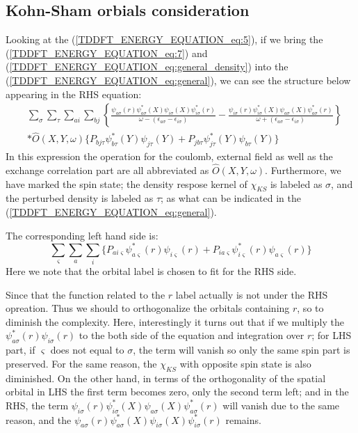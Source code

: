\subsection{Kohn-Sham orbials consideration}
%
%
%
%
Looking at the (\ref{TDDFT_ENERGY_EQUATION_eq:5}),  if we bring the 
(\ref{TDDFT_ENERGY_EQUATION_eq:7}) and
(\ref{TDDFT_ENERGY_EQUATION_eq:general_density})
into the
(\ref{TDDFT_ENERGY_EQUATION_eq:general}), we can see the structure
below appearing in the RHS equation: 
\begin{equation}
\begin{split}
 &\sum_{\sigma}\sum_{\tau}\sum_{ai}\sum_{bj}\left\lbrace
\frac{\psi_{a\sigma}(r)\psi_{a\sigma}^{*}(X)
\psi_{i\sigma}(X)\psi_{i\sigma}^{*}(r)} 
{\omega - (\epsilon_{a\sigma} - \epsilon_{i\sigma})} 
- 
\frac{\psi_{i\sigma}(r)\psi_{i\sigma}^{*}(X)
\psi_{a\sigma}(X)\psi_{a\sigma}^{*}(r)} {\omega +
(\epsilon_{a\sigma} - \epsilon_{i\sigma})}\right\rbrace  \\
&*\hat{O}(X,Y,\omega)\{P_{bj\tau}\psi^{*}_{b\tau}(Y)\psi_{j\tau}(Y) +
P_{jb\tau}\psi^{*}_{j\tau}(Y)\psi_{b\tau}(Y)\}
\end{split}
\end{equation} 
In this expression the operation for the coulomb, external field as
well as the exchange correlation part are all abbreviated as
$\hat{O}(X,Y,\omega)$. Furthermore, we have marked the spin state;
the density respose kernel of $\chi_{KS}$ is labeled as $\sigma$,
and the perturbed density is labeled as $\tau$; as what can be
indicated in the (\ref{TDDFT_ENERGY_EQUATION_eq:general}). 

The corresponding left hand side is:
\begin{equation}
 \sum_{\varsigma}\sum_{a}\sum_{i}\{P_{ai\varsigma}\psi^{*}_{a\varsigma
}(r)\psi_ {i\varsigma}(r) +
P_{ia\varsigma}\psi^{*}_{i\varsigma}(r)\psi_{a\varsigma}(r)\}
\end{equation}
Here we note that the orbital label is chosen to fit for the RHS
side.

Since that the function related to the $r$ label actually is not under
the RHS opreation. Thus we should to orthogonalize the orbitals
containing $r$, so to diminish the complexity. Here, interestingly it
turns out that if we multiply the
$\psi^{*}_{a\sigma}(r)\psi_{i\sigma}(r)$ to
the both side of the equation and integration over $r$; for LHS
part, if $\varsigma$ does not equal to $\sigma$, the term will
vanish so only the same spin part is preserved. For the same reason,
the $\chi_{KS}$ with opposite spin state is also diminished. 
On the other hand, in terms of the orthogonality of the spatial
orbital in LHS the first term becomes zero,
only the second term left; and in the RHS, the 
term $\psi_{i\sigma}(r)\psi_{i\sigma}^{*}(X)
\psi_{a\sigma}(X)\psi_{a\sigma}^{*}(r)$ will vanish due to the same
reason, and the $\psi_{a\sigma}(r)\psi_{a\sigma}^{*
}(X)\psi_{i\sigma}(X)\psi_{i\sigma}^{*}(r)$ remains.

